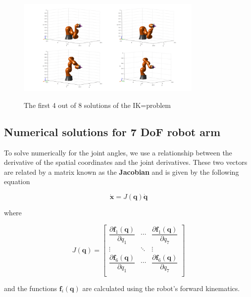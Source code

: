 \begin{center}
\begin{figure}[!htb]
\centering
\includegraphics[width=0.8\textwidth]{images/ik-4-solutions.png}\\
\caption{The first 4 out of 8 solutions of the IK=problem}
\end{figure}
\end{center}

\subsection{Numerical solutions for 7 DoF robot arm}

To solve numerically for the joint angles, we use a relationship between the derivative of the spatial coordinates and the joint derivatives. These two vectors 
are related by a matrix known as the \textbf{Jacobian} and is given by the following equation

\begin{equation}
\mathbf{\dot{x}} = J( \mathbf{q} ) \mathbf{\dot{q}}
\end{equation}

where

\begin{equation}
J( \mathbf{q} ) = \begin{bmatrix}
\dfrac{\partial \mathbf{f}_1(\mathbf{q})}{\partial q_{1}} & \cdots & \dfrac{\partial \mathbf{f}_1(\mathbf{q})}{\partial q_{7}} \\
\vdots & \ddots & \vdots \\
\dfrac{\partial \mathbf{f}_6(\mathbf{q})}{\partial q_{1}} & \cdots & \dfrac{\partial \mathbf{f}_6(\mathbf{q})}{\partial q_{7}} \\
\end{bmatrix}
\end{equation}

and the functions $\mathbf{f}_i(\mathbf{q})$ are calculated using the robot's forward kinematics.

